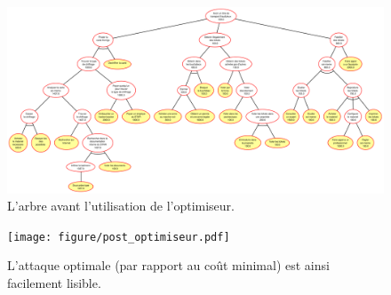 		\begin{landscape}
	        \begin{figure}
	            \includegraphics[height=0.82\textwidth]{figure/pre_optimiseur.pdf}
	            \caption{L'arbre avant l'utilisation de l'optimiseur.}
	            \label{fig:pre_optimiseur}
	        \end{figure}
    	\end{landscape}		
		
		\begin{figure}[h!]
			\centering
			\texttt{[image: figure/post\_optimiseur.pdf]}
			\caption{L'attaque optimale (par rapport au coût minimal) est ainsi facilement lisible.}
			\label{fig:arbre_post_opti}
		\end{figure}
	
